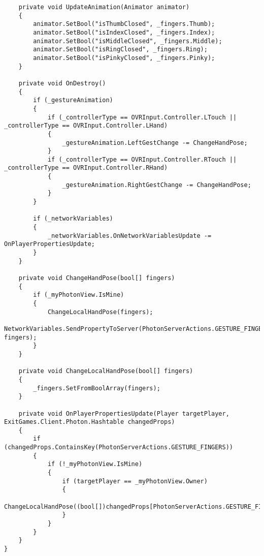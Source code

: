\begin{verbatim}
    private void UpdateAnimation(Animator animator)
    {
        animator.SetBool("isThumbClosed", _fingers.Thumb);
        animator.SetBool("isIndexClosed", _fingers.Index);
        animator.SetBool("isMiddleClosed", _fingers.Middle);
        animator.SetBool("isRingClosed", _fingers.Ring);
        animator.SetBool("isPinkyClosed", _fingers.Pinky);
    }

    private void OnDestroy()
    {
        if (_gestureAnimation)
        {
            if (_controllerType == OVRInput.Controller.LTouch || _controllerType == OVRInput.Controller.LHand)
            {
                _gestureAnimation.LeftGestChange -= ChangeHandPose;
            }
            if (_controllerType == OVRInput.Controller.RTouch || _controllerType == OVRInput.Controller.RHand)
            {
                _gestureAnimation.RightGestChange -= ChangeHandPose;
            }
        }

        if (_networkVariables)
        {
            _networkVariables.OnNetworkVariablesUpdate -= OnPlayerPropertiesUpdate;
        }
    }

    private void ChangeHandPose(bool[] fingers)
    {
        if (_myPhotonView.IsMine)
        {
            ChangeLocalHandPose(fingers);
            NetworkVariables.SendPropertyToServer(PhotonServerActions.GESTURE_FINGERS, fingers);
        }
    }

    private void ChangeLocalHandPose(bool[] fingers)
    {
        _fingers.SetFromBoolArray(fingers);
    }

    private void OnPlayerPropertiesUpdate(Player targetPlayer, ExitGames.Client.Photon.Hashtable changedProps)
    {
        if (changedProps.ContainsKey(PhotonServerActions.GESTURE_FINGERS))
        {
            if (!_myPhotonView.IsMine)
            {
                if (targetPlayer == _myPhotonView.Owner)
                {
                    ChangeLocalHandPose((bool[])changedProps[PhotonServerActions.GESTURE_FINGERS]);
                }
            }
        }
    }
}

\end{verbatim}
